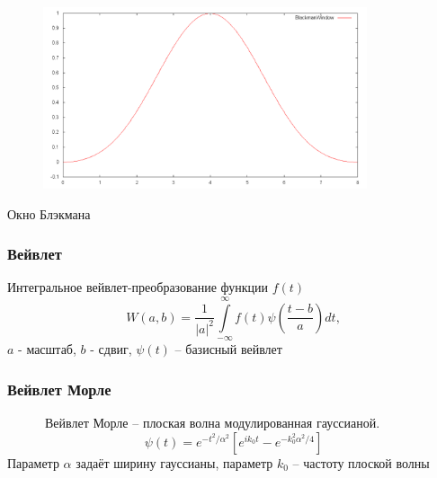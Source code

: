 \documentclass[11pt,slides,aspectratio=43]{beamer}%
\begin{document}
    \begin{frame}
        \begin{figure}[h!]
            \begin{center}
                \includegraphics[width = 0.85\textwidth]{window.png}
            \end{center}
        \end{figure}
        \begin{center}
            Окно Блэкмана
        \end{center}
    \end{frame}


    \begin{frame}
	\frametitle{Вейвлет}
	   Интегральное вейвлет-преобразование функции $f(t)$
    $$
        W(a, b) = \frac{1}{\left|a\right|^{2}} \int\limits_{-\infty}^{\infty} f(t) \psi(\frac{t - b}{a}) dt,
    $$
    $a$ - масштаб, $b$ - сдвиг, $\psi(t)$ -- базисный вейвлет
    \vskip2pt
	\end{frame}
	
    \begin{frame}
	\frametitle{Вейвлет Морле}
    ~~~~~~Вейвлет Морле -- плоская волна модулированная гауссианой.
    $$
        \psi(t) = e^{-t^{2} / \alpha^{2}}\left[e^{i k_{0} t} - e^{-k_{0}^{2}\alpha^{2}/4}\right]
    $$
    Параметр $\alpha$ задаёт ширину гауссианы, параметр $k_{0}$ -- частоту плоской волны
	\end{frame}
\end{document}
